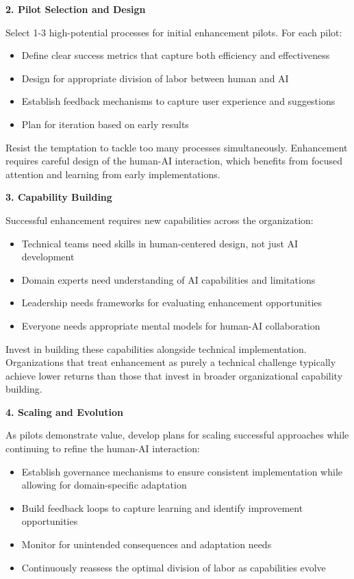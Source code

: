 \documentclass[
  Letterpaper,
]{scrbook}
\begin{document}
\textbf{2. Pilot Selection and Design}

Select 1-3 high-potential processes for initial enhancement pilots. For
each pilot:

\begin{itemize}
\item
  Define clear success metrics that capture both efficiency and
  effectiveness
\item
  Design for appropriate division of labor between human and AI
\item
  Establish feedback mechanisms to capture user experience and
  suggestions
\item
  Plan for iteration based on early results
\end{itemize}

Resist the temptation to tackle too many processes simultaneously.
Enhancement requires careful design of the human-AI interaction, which
benefits from focused attention and learning from early implementations.

\textbf{3. Capability Building}

Successful enhancement requires new capabilities across the
organization:

\begin{itemize}
\item
  Technical teams need skills in human-centered design, not just AI
  development
\item
  Domain experts need understanding of AI capabilities and limitations
\item
  Leadership needs frameworks for evaluating enhancement opportunities
\item
  Everyone needs appropriate mental models for human-AI collaboration
\end{itemize}

Invest in building these capabilities alongside technical
implementation. Organizations that treat enhancement as purely a
technical challenge typically achieve lower returns than those that
invest in broader organizational capability building.

\textbf{4. Scaling and Evolution}

As pilots demonstrate value, develop plans for scaling successful
approaches while continuing to refine the human-AI interaction:

\begin{itemize}
\item
  Establish governance mechanisms to ensure consistent implementation
  while allowing for domain-specific adaptation
\item
  Build feedback loops to capture learning and identify improvement
  opportunities
\item
  Monitor for unintended consequences and adaptation needs
\item
  Continuously reassess the optimal division of labor as capabilities
  evolve
\end{itemize}
\end{document}
